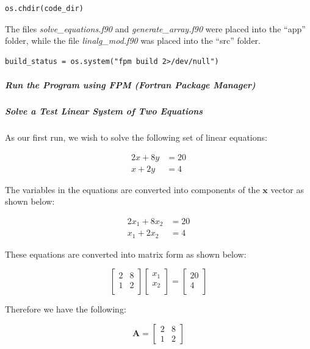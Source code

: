 \begin{verbatim}
os.chdir(code_dir)
\end{verbatim}

The files \textit{solve\_equations.f90} and \textit{generate\_array.f90} were placed into the ``app'' folder, while the file \textit{linalg\_mod.f90} was placed into the ``src'' folder.

\begin{verbatim}
build_status = os.system("fpm build 2>/dev/null")
\end{verbatim}

\subparagraph{Run the Program using FPM (Fortran Package Manager)}

\subparagraph{Solve a Test Linear System of Two Equations}

As our first run, we wish to solve the following set of linear equations:

\begin{align*}
2x+8y & = 20 \\
x+2y  & = 4
\end{align*}

The variables in the equations are converted into components of the $\mathbf{x}$ vector as shown below:

\begin{align*}
2x_1+8x_2 & = 20 \\
x_1+2x_2  & = 4
\end{align*}

These equations are converted into matrix form as shown below:

\begin{equation*}
\left[
\begin{array}{cc}
2 & 8 \\
1 & 2 \\
\end{array}
\right]
\left[
\begin{array}{c}
x_1 \\
x_2 \\
\end{array}
\right]
=
\left[
\begin{array}{c}
20 \\
4 \\
\end{array}
\right]
\end{equation*}

Therefore we have the following:

\begin{equation}
\mathbf{A} = 
\left[
\begin{array}{cc}
2 & 8 \\
1 & 2 
\end{array}
\right]
\end{equation}


